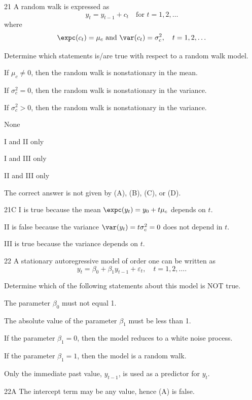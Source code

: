 \begin{question}{21}
A random walk is expressed as
\[ y_t = y_{t-1} + c_t \quad \text{for } t = 1, 2, \ldots \]
where
\[ \expc(c_t) = \mu_c \text{ and } \var(c_t) = \sigma_c^2, \quad t = 1, 2, \ldots \]

Determine which statements is/are true with respect to a random walk model.
\begin{statements}
\item If $\mu_c \neq 0$, then the random walk is nonstationary in the mean.
\item If $\sigma_c^2 = 0$, then the random walk is nonstationary in the variance.
\item If $\sigma_c^2 > 0$, then the random walk is nonstationary in the variance.
\end{statements}

\begin{choices}
\item None
\item I and II only
\item I and III only
\item II and III only
\item The correct answer is not given by (A), (B), (C), or (D).
\end{choices}
\end{question}
\begin{solution}{21}{C}
I is true because the mean $\expc(y_t) = y_0 + t\mu_c$ depends on $t$.

II is false because the variance $\var(y_t) = t\sigma_c^2 = 0$ does not depend in $t$.

III is true because the variance depends on $t$.
\end{solution}

\begin{question}{22}
A stationary autoregressive model of order one can be written as
\[ y_t = \beta_0 + \beta_1 y_{t-1} + \varepsilon_t, \quad t = 1, 2, \ldots. \]

Determine which of the following statements about this model is NOT true.

\begin{choices}
\item The parameter $\beta_0$ must not equal 1.
\item The absolute value of the parameter $\beta_1$ must be less than 1.
\item If the parameter $\beta_1 = 0$, then the model reduces to a white noise process.
\item If the parameter $\beta_1 = 1$, then the model is a random walk.
\item Only the immediate past value, $y_{t-1}$, is used as a predictor for $y_t$.
\end{choices}
\end{question}
\begin{solution}{22}{A}
The intercept term may be any value, hence (A) is false.
\end{solution}

